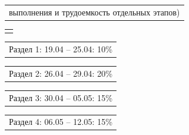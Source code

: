 \documentclass[12pt, А4, twoside]{article}
\begin{document}
\begin{FlushLeft}
    \begin{tabular}{p{17.25cm}}
        \textsf{выполнения и трудоемкость отдельных этапов)} \vspace{0pt} \hline \\
    \end{tabular}

    \begin{tabular}{p{17.25cm}}
        \vspace{0pt} \hline \\
    \end{tabular}

    \vspace{-0.1 cm}

    \begin{tabular}{p{17.25cm}}
    	\hspace{0.3cm} \textsf{Раздел 1:} \hspace{2.54cm} \textsf{19.04 {--} 25.04:} \hspace{0.5cm} \textsf{10\%} \vspace{0pt} \hline
    \end{tabular}
    
    \vspace{-0.1 cm}
    
    \begin{tabular}{p{17.25cm}}
    	\hspace{0.3cm} \textsf{Раздел 2:} \hspace{2.54cm} \textsf{26.04 {--} 29.04:} \hspace{0.5cm} \textsf{20\%} \vspace{0pt} \hline
    \end{tabular}
    
    \vspace{-0.1 cm}
    
    \begin{tabular}{p{17.25cm}}
    	\hspace{0.3cm} \textsf{Раздел 3:} \hspace{2.54cm} \textsf{30.04 {--} 05.05:} \hspace{0.5cm} \textsf{15\%} \vspace{0pt} \hline
    \end{tabular}
    
    \vspace{-0.1 cm}
    
    \begin{tabular}{p{17.25cm}}
    	\hspace{0.3cm} \textsf{Раздел 4:} \hspace{2.54cm} \textsf{06.05 {--} 12.05:} \hspace{0.5cm} \textsf{15\%} \vspace{0pt} \hline
    \end{tabular}
    

\end{FlushLeft}
\end{document}
